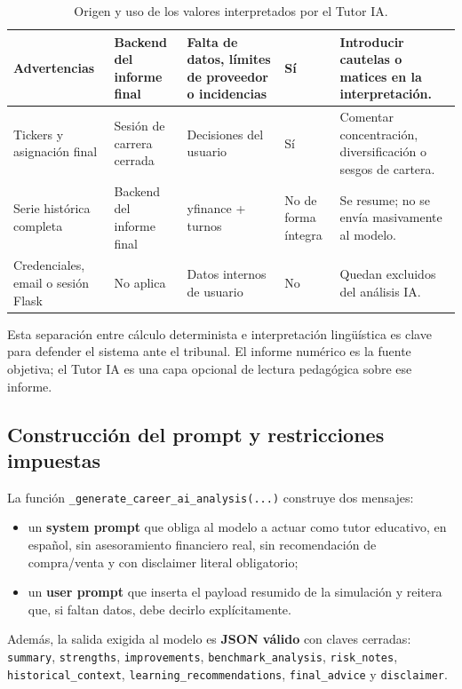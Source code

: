 \begin{table}[htbp]
\begin{tabular}{|p{}|p{}|p{}|p{}|p{}|}
Advertencias & Backend del informe final & Falta de datos, límites de proveedor o incidencias & Sí & Introducir cautelas o matices en la interpretación. \\ \hline
Tickers y asignación final & Sesión de carrera cerrada & Decisiones del usuario & Sí & Comentar concentración, diversificación o sesgos de cartera. \\ \hline
Serie histórica completa & Backend del informe final & yfinance + turnos & No de forma íntegra & Se resume; no se envía masivamente al modelo. \\ \hline
Credenciales, email o sesión Flask & No aplica & Datos internos de usuario & No & Quedan excluidos del análisis IA. \\ \hline
\end{tabular}
\caption{Origen y uso de los valores interpretados por el Tutor IA.}
\label{tab:origen-valores-tutor-ia}
\end{table}

Esta separación entre cálculo determinista e interpretación lingüística es clave para defender el sistema ante el tribunal. El informe numérico es la fuente objetiva; el Tutor IA es una capa opcional de lectura pedagógica sobre ese informe.

\subsection{Construcción del prompt y restricciones impuestas}

La función \texttt{\_generate\_career\_ai\_analysis(...)} construye dos mensajes:

\begin{itemize}
    \item un \textbf{system prompt} que obliga al modelo a actuar como tutor educativo, en español, sin asesoramiento financiero real, sin recomendación de compra/venta y con disclaimer literal obligatorio;
    \item un \textbf{user prompt} que inserta el payload resumido de la simulación y reitera que, si faltan datos, debe decirlo explícitamente.
\end{itemize}

Además, la salida exigida al modelo es \textbf{JSON válido} con claves cerradas: \texttt{summary}, \texttt{strengths}, \texttt{improvements}, \texttt{benchmark\_analysis}, \texttt{risk\_notes}, \texttt{historical\_context}, \texttt{learning\_recommendations}, \texttt{final\_advice} y \texttt{disclaimer}.

